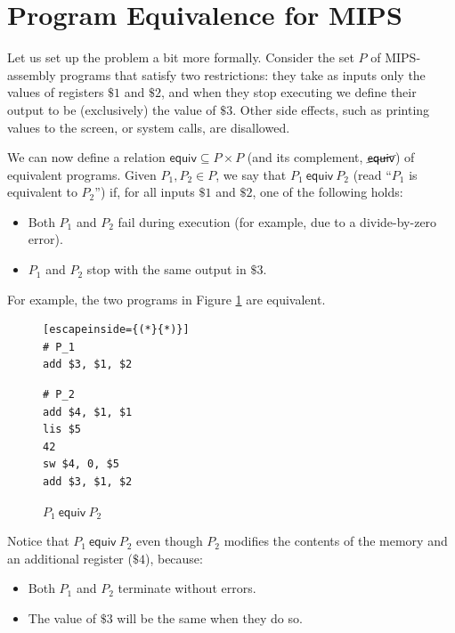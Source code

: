 \documentclass{llncs}
\newcommand{\erel}{\textsf{equiv}}
\newcommand{\pequiv}[2]{#1 \ \erel \ #2}
\begin{document}
\section{Program Equivalence for MIPS}
\label{progequiv}

Let us set up the problem a bit more formally. Consider the set $P$ of MIPS-assembly programs that satisfy two restrictions: they take as inputs only the values of registers $\$1$ and $\$2$, and when they stop executing we define their output to be (exclusively) the value of $\$3$. Other side effects, such as printing values to the screen, or system calls, are disallowed.

We can now define a relation $\erel \subseteq P \times P$ (and its complement, $\cancel{\erel}$) of equivalent programs. Given $P_1, P_2 \in P$, we say that $\pequiv{P_1}{P_2}$ (read ``$P_1$ is equivalent to $P_2$'') if, for all inputs $\$1$ and $\$2$, one of the following holds:
\begin{itemize}
\item Both $P_1$ and $P_2$ fail during execution (for example, due to a divide-by-zero error).
\item $P_1$ and $P_2$ stop with the same output in $\$3$. 
\end{itemize} 

For example, the two programs in Figure \ref{equivprogs} are equivalent.
 
\begin{figure}
\begin{multicols}{2}
\begin{lstlisting}[escapeinside={(*}{*)}]
# P_1
add $3, $1, $2
\end{lstlisting}
\vfill\null
\columnbreak
\begin{lstlisting}
# P_2
add $4, $1, $1
lis $5
42
sw $4, 0, $5
add $3, $1, $2
\end{lstlisting}
\end{multicols}
\caption{$\pequiv{P_1}{P_2}$}
\label{equivprogs}
\end{figure}

Notice that $\pequiv{P_1}{P_2}$ even though $P_2$ modifies the contents of the memory and an additional register ($\$4$), because:
\begin{itemize}
\item Both $P_1$ and $P_2$ terminate without errors.
\item The value of $\$3$ will be the same when they do so.
\end{itemize}
\end{document}
